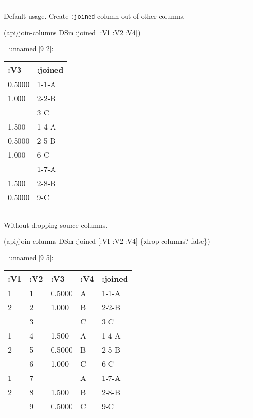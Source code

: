 \documentclass[]{article}
\newenvironment{Shaded}{\begin{snugshade}}{\end{snugshade}}
\newcommand{\VariableTok}[1]{\textcolor[rgb]{0.00,0.00,0.00}{#1}}
\newcommand{\AttributeTok}[1]{\textcolor[rgb]{0.77,0.63,0.00}{#1}}
\newcommand{\NormalTok}[1]{#1}
\begin{document}
\begin{center}\rule{0.5\linewidth}{0.5pt}\end{center}

Default usage. Create \texttt{:joined} column out of other columns.

\begin{Shaded}
\begin{Highlighting}[]
\NormalTok{(api/join-columns DSm }\AttributeTok{:joined}\NormalTok{ [}\AttributeTok{:V1} \AttributeTok{:V2} \AttributeTok{:V4}\NormalTok{])}
\end{Highlighting}
\end{Shaded}

\_unnamed {[}9 2{]}:

\begin{longtable}[]{@{}ll@{}}
\toprule
:V3 & :joined\tabularnewline
\midrule
\endhead
0.5000 & 1-1-A\tabularnewline
1.000 & 2-2-B\tabularnewline
& 3-C\tabularnewline
1.500 & 1-4-A\tabularnewline
0.5000 & 2-5-B\tabularnewline
1.000 & 6-C\tabularnewline
& 1-7-A\tabularnewline
1.500 & 2-8-B\tabularnewline
0.5000 & 9-C\tabularnewline
\bottomrule
\end{longtable}

\begin{center}\rule{0.5\linewidth}{0.5pt}\end{center}

Without dropping source columns.

\begin{Shaded}
\begin{Highlighting}[]
\NormalTok{(api/join-columns DSm }\AttributeTok{:joined}\NormalTok{ [}\AttributeTok{:V1} \AttributeTok{:V2} \AttributeTok{:V4}\NormalTok{] \{}\AttributeTok{:drop-columns}\NormalTok{? }\VariableTok{false}\NormalTok{\})}
\end{Highlighting}
\end{Shaded}

\_unnamed {[}9 5{]}:

\begin{longtable}[]{@{}lllll@{}}
\toprule
:V1 & :V2 & :V3 & :V4 & :joined\tabularnewline
\midrule
\endhead
1 & 1 & 0.5000 & A & 1-1-A\tabularnewline
2 & 2 & 1.000 & B & 2-2-B\tabularnewline
& 3 & & C & 3-C\tabularnewline
1 & 4 & 1.500 & A & 1-4-A\tabularnewline
2 & 5 & 0.5000 & B & 2-5-B\tabularnewline
& 6 & 1.000 & C & 6-C\tabularnewline
1 & 7 & & A & 1-7-A\tabularnewline
2 & 8 & 1.500 & B & 2-8-B\tabularnewline
& 9 & 0.5000 & C & 9-C\tabularnewline
\bottomrule
\end{longtable}
\end{document}
